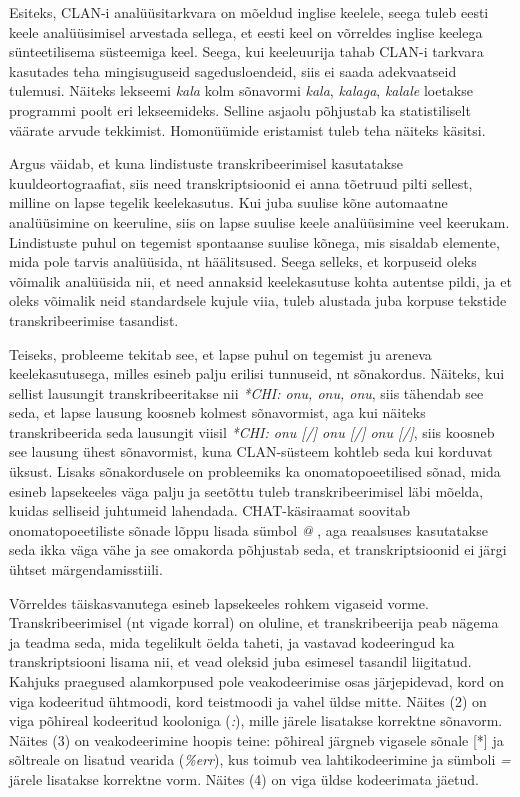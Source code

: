 \documentclass[12pt]{article}
\begin{document}
Esiteks, CLAN-i analüüsitarkvara on mõeldud inglise keelele, seega tuleb eesti keele analüüsimisel arvestada sellega, et eesti keel on võrreldes inglise keelega sünteetilisema süsteemiga keel. Seega, kui keeleuurija tahab CLAN-i tarkvara kasutades teha mingisuguseid sagedusloendeid, siis ei saada adekvaatseid tulemusi. Näiteks lekseemi \emph{kala} kolm sõnavormi \emph{kala}, \emph{kalaga}, \emph{kalale} loetakse programmi poolt eri lekseemideks. Selline asjaolu põhjustab ka statistiliselt väärate arvude tekkimist. Homonüümide eristamist tuleb teha näiteks käsitsi.\citep[70]{Argus2007}

Argus väidab, et kuna lindistuste transkribeerimisel kasutatakse kuuldeortograafiat, siis need transkriptsioonid ei anna tõetruud pilti sellest, milline on lapse tegelik keelekasutus. Kui juba suulise kõne automaatne analüüsimine on keeruline, siis on lapse suulise keele analüüsimine veel keerukam. Lindistuste puhul on tegemist spontaanse suulise kõnega, mis sisaldab elemente, mida pole tarvis analüüsida, nt häälitsused. Seega selleks, et korpuseid oleks võimalik analüüsida nii, et need annaksid keelekasutuse kohta autentse pildi, ja et oleks võimalik neid standardsele kujule viia, tuleb alustada juba korpuse tekstide transkribeerimise tasandist. \citep[71]{Argus2007}

Teiseks, probleeme tekitab see, et lapse puhul on tegemist ju areneva keelekasutusega, milles esineb palju erilisi tunnuseid, nt sõnakordus. Näiteks, kui sellist lausungit transkribeeritakse nii \emph{*CHI: onu, onu, onu}, siis tähendab see seda, et lapse lausung koosneb kolmest sõnavormist, aga kui näiteks transkribeerida seda lausungit viisil \emph{*CHI: onu [/] onu [/] onu [/]}, siis koosneb see lausung ühest sõnavormist, kuna CLAN-süsteem kohtleb seda kui korduvat üksust. Lisaks sõnakordusele on probleemiks ka onomatopoeetilised sõnad, mida esineb lapsekeeles väga palju ja seetõttu tuleb transkribeerimisel läbi mõelda, kuidas selliseid juhtumeid lahendada. CHAT-käsiraamat soovitab onomatopoeetiliste sõnade lõppu lisada sümbol \emph{@} \citep[72--73]{Argus2007}, aga reaalsuses kasutatakse seda ikka väga vähe ja see omakorda põhjustab seda, et transkriptsioonid ei järgi ühtset märgendamisstiili.

Võrreldes täiskasvanutega esineb lapsekeeles rohkem vigaseid vorme. Transkribeerimisel (nt vigade korral) on oluline, et transkribeerija peab nägema ja teadma seda, mida tegelikult öelda taheti, ja vastavad kodeeringud ka transkriptsiooni lisama nii, et vead oleksid juba esimesel tasandil liigitatud. \citep[74]{Argus2007} Kahjuks praegused alamkorpused pole veakodeerimise osas järjepidevad, kord on viga kodeeritud ühtmoodi, kord teistmoodi ja vahel üldse mitte. Näites (2) on viga põhireal kodeeritud kooloniga (\emph{:}), mille järele lisatakse korrektne sõnavorm. Näites (3) on veakodeerimine hoopis teine: põhireal järgneb vigasele sõnale [*] ja sõltreale on lisatud vearida (\emph{\%err}), kus  toimub vea lahtikodeerimine ja sümboli \emph{=} järele lisatakse korrektne vorm. Näites (4) on viga üldse kodeerimata jäetud.\\
\hfill
\end{document}
